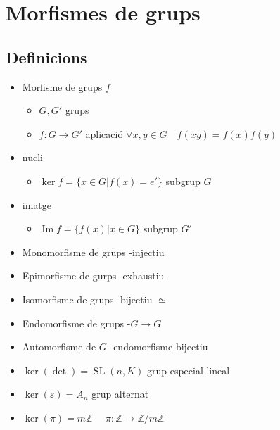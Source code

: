 \documentclass{article}
\DeclareMathOperator{\Ima}{Im}
\DeclareMathOperator{\SL}{SL}
\newcommand{\Z}{\mathbb{Z}}
\begin{document}
\section{Morfismes de grups}
\subsection*{Definicions}
\begin{itemize}
\item Morfisme de grups $f$
	\begin{itemize}
	\item $G, G'$ grups
	\item $f:G\to G'$ aplicació
		\subitem $\forall x, y \in G\quad f(xy) = f(x)f(y)$
	\end{itemize}
\item nucli
	\begin{itemize}
	\item $\ker{f} = \{x \in G | f(x) = e'\}$ subgrup $G$
	\end{itemize}
\item imatge
	\begin{itemize}
	\item $\Ima{f} = \{f(x)| x \in G\}$ subgrup $G'$
	\end{itemize}
\item Monomorfisme de grups -injectiu
\item Epimorfisme de gurps -exhaustiu
\item Isomorfisme de grups -bijectiu $\simeq$
\item Endomorfisme de grups -$G \to G$
\item Automorfisme de $G$ -endomorfisme bijectiu

\item $\ker{(\det)} = \SL(n, K)$ grup especial lineal
\item $\ker{(\varepsilon)} = A_n$ grup alternat
\item $\ker{(\pi)} = m\Z$ $\quad \pi:\Z \to \Z/m\Z$
\end{itemize}
\end{document}
